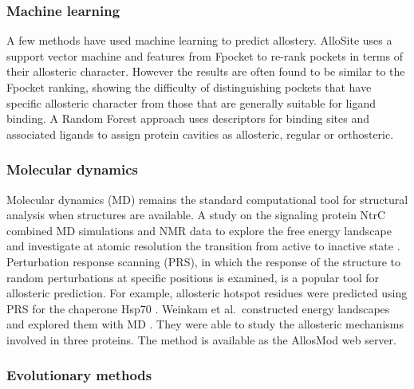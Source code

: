 \subsubsection{Machine learning}

A few methods have used machine learning to predict allostery.
AlloSite \cite{Huang2013} uses a support vector machine and features from Fpocket \cite{LeGuilloux2009} to re-rank pockets in terms of their allosteric character.
However the results are often found to be similar to the Fpocket ranking, showing the difficulty of distinguishing pockets that have specific allosteric character from those that are generally suitable for ligand binding.
A Random Forest approach \cite{Chen2016} uses descriptors for binding sites and associated ligands to assign protein cavities as allosteric, regular or orthosteric.


\subsubsection{Molecular dynamics}

Molecular dynamics (MD) remains the standard computational tool for structural analysis when structures are available.
A study on the signaling protein NtrC combined MD simulations and NMR data to explore the free energy landscape and investigate at atomic resolution the transition from active to inactive state \cite{Pontiggia2015}.
Perturbation response scanning (PRS), in which the response of the structure to random perturbations at specific positions is examined, is a popular tool for allosteric prediction.
For example, allosteric hotspot residues were predicted using PRS for the chaperone Hsp70 \cite{Penkler2017}.
Weinkam et al.\ constructed energy landscapes and explored them with MD \cite{Weinkam2012}.
They were able to study the allosteric mechanisms involved in three proteins.
The method is available as the AllosMod web server.


\subsubsection{Evolutionary methods}

